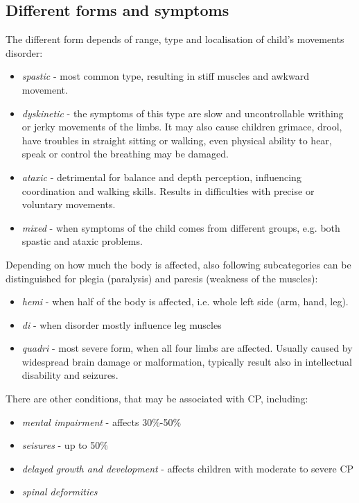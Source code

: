\subsection{Different forms and symptoms}
The different form depends of range, type and localisation of child's movements disorder:
\begin{itemize}
\item \emph{spastic} - most common type, resulting in stiff muscles and awkward movement.
\item \emph{dyskinetic} - the symptoms of this type are slow and uncontrollable writhing or jerky movements of the limbs. It may also cause children grimace, drool, have troubles in straight sitting or walking, even physical ability to hear, speak or control the breathing may be damaged. 
\item \emph{ataxic} - detrimental for balance and depth perception, influencing coordination and walking skills. Results in difficulties with precise or voluntary movements. 
\item \emph{mixed} - when symptoms of the child comes from different groups, e.g. both spastic and ataxic problems. 
\end{itemize}

Depending on how much the body is affected, also following subcategories can be distinguished for plegia (paralysis) and paresis (weakness of the muscles):
\begin{itemize}
\item \emph{hemi} - when half of the body is affected, i.e. whole left side (arm, hand, leg).
\item \emph{di} - when disorder mostly influence leg muscles
\item \emph{quadri} - most severe form, when all four limbs are affected. Usually caused by widespread brain damage or malformation, typically result also in intellectual disability and seizures. 
\end{itemize}

There are other conditions, that may be associated with CP, including:
\begin{itemize}
\item \emph{mental impairment} - affects 30\%-50\%
\item \emph{seisures} - up to 50\%
\item \emph{delayed growth and development} - affects children with moderate to severe CP
\item \emph{spinal deformities}
\end{itemize}


